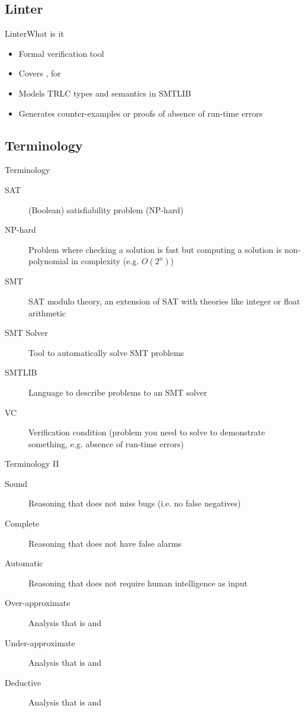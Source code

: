 \documentclass[aspectratio=169]{beamer}
\begin{document}
\subsection{Linter}
\begin{frame}{Linter}{What is it}
  \begin{itemize}
  \item Formal verification tool
  \item Covers , for 
  \item Models TRLC types and semantics in SMTLIB
  \item Generates counter-examples or proofs of absence of run-time
    errors
  \end{itemize}
\end{frame}

\subsection{Terminology}
\begin{frame}{Terminology}
  \begin{description}
  \item[SAT] (Boolean) satisfiability problem (NP-hard)
  \item[NP-hard] Problem where checking a solution is fast but
    computing a solution is non-polynomial in complexity
    (e.g. $O(2^n)$)
  \item[SMT] SAT modulo theory, an extension of SAT with theories like
    integer or float arithmetic
  \item[SMT Solver] Tool to automatically solve SMT problems
  \item[SMTLIB] Language to describe problems to an SMT solver
  \item[VC] Verification condition (problem you need to solve to
    demonstrate something, e.g. absence of run-time errors)
  \end{description}
\end{frame}

\begin{frame}{Terminology II}
  \begin{description}
  \item[Sound] Reasoning that does not miss bugs (i.e. no
    false negatives)
  \item[Complete] Reasoning that does not have false alarms
  \item[Automatic] Reasoning that does not require human intelligence
    as input
  \item[Over-approximate] Analysis that is  and
  \item[Under-approximate] Analysis that is  and
  \item[Deductive] Analysis that is  and
  \end{description}
\end{frame}
\end{document}
